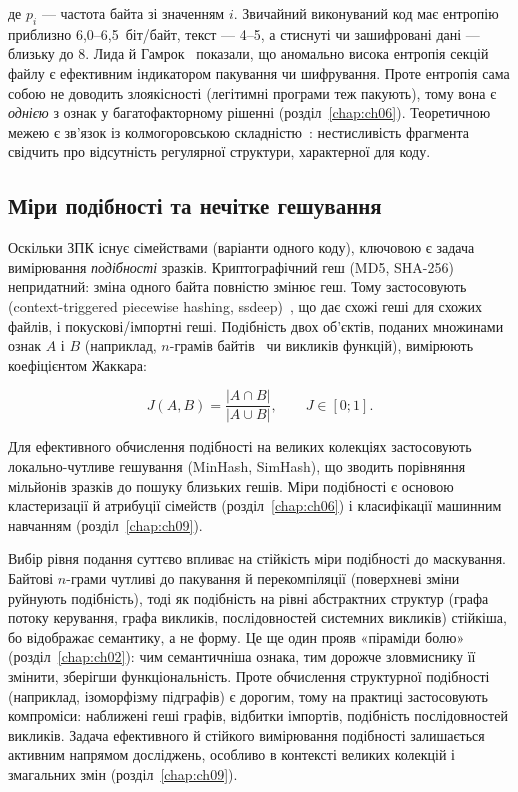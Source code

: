 де $p_i$ --- частота байта зі значенням $i$. Звичайний виконуваний код має ентропію приблизно 6,0--6,5~біт/байт, текст --- 4--5, а стиснуті чи зашифровані дані --- близьку до 8. Лида й Гамрок~\cite{ch03:lyda} показали, що аномально висока ентропія секцій файлу є ефективним індикатором пакування чи шифрування. Проте ентропія сама собою не доводить злоякісності (легітимні програми теж пакують), тому вона є \emph{однією} з ознак у багатофакторному рішенні (розділ~\ref{chap:ch06}). Теоретичною межею є зв'язок із колмогоровською складністю~\cite{ch03:li}: нестисливість фрагмента свідчить про відсутність регулярної структури, характерної для коду.

\subsection{Міри подібності та нечітке гешування}

Оскільки ЗПК існує сімействами (варіанти одного коду), ключовою є задача вимірювання \emph{подібності} зразків. Криптографічний геш (MD5, SHA-256) непридатний: зміна одного байта повністю змінює геш. Тому застосовують  (context-triggered piecewise hashing, ssdeep)~\cite{ch03:kornblum}, що дає схожі геші для схожих файлів, і покускові/імпортні геші. Подібність двох об'єктів, поданих множинами ознак $A$ і $B$ (наприклад, $n$-грамів байтів~\cite{ch03:kolter} чи викликів функцій), вимірюють коефіцієнтом Жаккара:

\begin{equation}
J(A,B) = \frac{|A \cap B|}{|A \cup B|},\qquad J \in [0;1].
\label{eq:ch03-jaccard}
\end{equation}

Для ефективного обчислення подібності на великих колекціях застосовують локально-чутливе гешування (MinHash, SimHash), що зводить порівняння мільйонів зразків до пошуку близьких гешів. Міри подібності є основою кластеризації й атрибуції сімейств (розділ~\ref{chap:ch06}) і класифікації машинним навчанням (розділ~\ref{chap:ch09}).

Вибір рівня подання суттєво впливає на стійкість міри подібності до маскування. Байтові $n$-грами чутливі до пакування й перекомпіляції (поверхневі зміни руйнують подібність), тоді як подібність на рівні абстрактних структур (графа потоку керування, графа викликів, послідовностей системних викликів) стійкіша, бо відображає семантику, а не форму. Це ще один прояв «піраміди болю» (розділ~\ref{chap:ch02}): чим семантичніша ознака, тим дорожче зловмиснику її змінити, зберігши функціональність. Проте обчислення структурної подібності (наприклад, ізоморфізму підграфів) є дорогим, тому на практиці застосовують компроміси: наближені геші графів, відбитки імпортів, подібність послідовностей викликів. Задача ефективного й стійкого вимірювання подібності залишається активним напрямом досліджень, особливо в контексті великих колекцій і змагальних змін (розділ~\ref{chap:ch09}).

